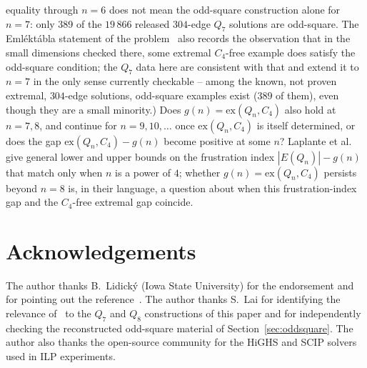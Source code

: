\documentclass[12pt]{article}
\newcommand{\ex}{\mathrm{ex}}
\begin{document}
\begin{enumerate}
    equality through $n=6$ does not mean the
    odd-square construction alone for $n=7$: only 389 of the
    $19\,866$ released $304$-edge $Q_7$ solutions are odd-square.
    The Emléktábla statement of the problem~\cite{Emlek26} also records
    the observation that in the small dimensions checked there, some
    extremal $C_4$-free example does satisfy the odd-square condition;
    the $Q_7$ data here are consistent with that and extend it to $n=7$
    in the only sense currently checkable -- among the known, not proven
    extremal, $304$-edge solutions, odd-square examples exist ($389$ of
    them), even though they are a small minority.) Does
    $g(n)=\ex(Q_n,C_4)$ also hold at $n=7,8$, and continue for
    $n=9,10,\ldots$ once
    $\ex(Q_n,C_4)$ is itself determined, or does the gap
    $\ex(Q_n,C_4)-g(n)$ become positive at some $n$? Laplante et
    al.~\cite{LNSW26} give general lower and upper bounds on the
    frustration index $|E(Q_n)|-g(n)$ that match only when $n$ is a
    power of $4$; whether $g(n)=\ex(Q_n,C_4)$ persists beyond $n=8$ is,
    in their language, a question about when this frustration-index
    gap and the $C_4$-free extremal gap coincide.
\end{enumerate}

\section*{Acknowledgements}
The author thanks B.~Lidick\'y (Iowa State University) for the endorsement
and for pointing out the reference~\cite{Bab12}.
The author thanks S.~Lai for identifying the relevance
of~\cite{DPTV79,MPR95} to the $Q_7$ and $Q_8$ constructions of this paper
and for independently checking the reconstructed odd-square material of
Section~\ref{sec:oddsquare}.
The author also thanks the open-source community for the HiGHS and SCIP
solvers used in ILP experiments.
\end{document}
